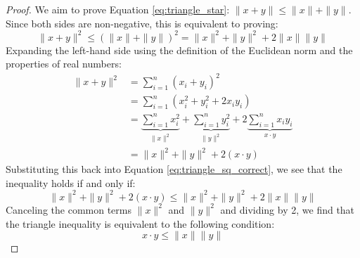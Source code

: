\begin{math-stroke}
\begin{proof}
We aim to prove Equation \ref{eq:triangle_star}: $\|x + y\| \le \|x\| + \|y\|$. Since both sides are non-negative, this is equivalent to proving:
\begin{equation} \label{eq:triangle_sq_correct}
\|x + y\|^2 \le (\|x\| + \|y\|)^2 = \|x\|^2 + \|y\|^2 + 2\|x\|\|y\|
\end{equation}
Expanding the left-hand side using the definition of the Euclidean norm and the properties of real numbers:
\begin{align*}
\|x + y\|^2 &= \sum_{i=1}^n (x_i + y_i)^2 \\
&= \sum_{i=1}^n (x_i^2 + y_i^2 + 2x_i y_i) \\
&= \underbrace{\sum_{i=1}^n x_i^2}_{\|x\|^2} + \underbrace{\sum_{i=1}^n y_i^2}_{\|y\|^2} + 2\underbrace{\sum_{i=1}^n x_i y_i}_{x \cdot y} \\
&= \|x\|^2 + \|y\|^2 + 2(x \cdot y)
\end{align*}
Substituting this back into Equation \ref{eq:triangle_sq_correct}, we see that the inequality holds if and only if:
\[
\|x\|^2 + \|y\|^2 + 2(x \cdot y) \le \|x\|^2 + \|y\|^2 + 2\|x\|\|y\|
\]
Canceling the common terms $\|x\|^2$ and $\|y\|^2$ and dividing by 2, we find that the triangle inequality is equivalent to the following condition:
\begin{equation} \label{eq:cs_goal}
x \cdot y \le \|x\|\|y\|
\end{equation}
\end{proof}
\end{math-stroke}

